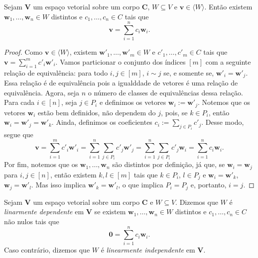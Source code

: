 \begin{proposition}
	Sejam $\bm V$ um espaço vetorial sobre um corpo $\bm C$, $W \subseteq V$ e $\bm v \in \langle W \rangle$. Então existem $\bm w_1, \ldots, \bm w_n \in W$ distintos e $c_1, \ldots, c_n \in C$ tais que
	\begin{equation*}
	\bm v = \sum_{i=1}^n c_i \bm w_i.
	\end{equation*}
\end{proposition}
\begin{proof}
	Como $\bm v \in \langle W \rangle$, existem $\bm w'_1, \ldots, \bm w'_m \in W$ e $c'_1, \ldots, c'_m \in C$ tais que $\bm v = \sum_{i=1}^m c'_i \bm w'_i$. Vamos particionar o conjunto dos índices $[m]$ com a seguinte relação de equivalência: para todo $i,j \in [m]$, $i \sim j$ se, e somente se, $\bm w'_i = \bm w'_j$. Essa relação é de equivalência pois a igualddade de vetores é uma relação de equivalência. Agora, seja $n$ o número de classes de equivalências dessa relação. Para cada $i \in [n]$, seja $j \in P_i$ e definimos os vetores $\bm w_i := \bm w'_j$. Notemos que os vetores $\bm w_i$ estão bem definidos, não dependem do $j$, pois, se $k \in P_i$, então $\bm w_i = \bm w'_j = \bm w'_k$. Ainda, definimos os coeficientes $c_i := \sum _{j \in P_i} c'_j$. Desse modo, segue que
	\begin{equation*}
	\bm v = \sum_{i=1}^m c'_i \bm w'_i = \sum_{i=1}^n \sum_{j \in P_i} c'_j \bm w'_j = \sum_{i=1}^n \sum_{j \in P_i} c'_j \bm w_i =  \sum_{i=1}^n c_i \bm w_i.
	\end{equation*}
	Por fim, notemos que os $\bm w_1, \ldots, \bm w_n$ são distintos por definição, já que, se $\bm w_i = \bm w_j$ para $i,j \in [n]$, então existem $k,l \in [m]$ tais que $k \in P_i$, $l \in P_j$ e $\bm w_i = \bm w'_k$, $\bm w_j = \bm w'_l$. Mas isso implica $\bm w'_k=\bm w'_l$, o que implica $P_i = P_j$ e, portanto, $i = j$.
\end{proof}

\begin{definition}
	Sejam $\bm V$ um espaço vetorial sobre um corpo $\bm C$ e $W \subseteq V$. Dizemos que $W$ é \emph{linarmente dependente} em $\bm V$ se existem $\bm w_1, \ldots,\bm w_n \in W$ distintos e $c_1,\ldots,c_n \in C$ não nulos tais que
	\begin{equation*}
	\bm 0 = \sum_{i=1}^n c_i \bm w_i.
	\end{equation*}
Caso contrário, dizemos que $W$ é \emph{linearmente independente} em $\bm V$.
\end{definition}

